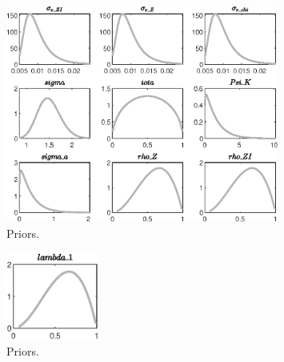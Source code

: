  
\begin{figure}[H]
\centering
\includegraphics[width=0.80\textwidth]{two_sector_RBC_mobile/graphs/two_sector_RBC_mobile_Priors1}
\caption{Priors.}\label{Fig:Priors:1}
\end{figure}
\begin{figure}[H]
\centering
\includegraphics[width=0.27\textwidth]{two_sector_RBC_mobile/graphs/two_sector_RBC_mobile_Priors2}
\caption{Priors.}\label{Fig:Priors:2}
\end{figure}
 
